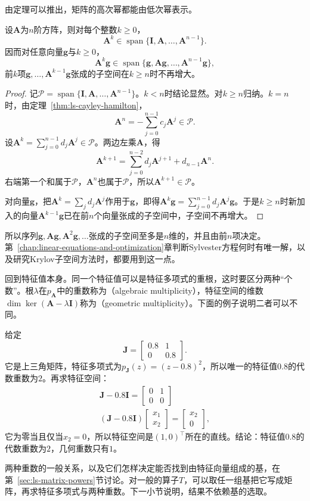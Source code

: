 由定理可以推出，矩阵的高次幂都能由低次幂表示。
\begin{theorem}[高次幂的降次]
\label{thm:ls-power-reduction}
设$\bm A$为$n$阶方阵，则对每个整数$k\geq0$，
\[
 \bm A^k\in\operatorname{span}\{\bm I,\bm A,\ldots,\bm A^{n-1}\}.
\]
因而对任意向量$\bm g$与$k\geq0$，
\[
 \bm A^k\bm g\in\operatorname{span}\{\bm g,\bm A\bm g,\ldots,\bm A^{n-1}\bm g\},
\]
前$k$项$\bm g,\ldots,\bm A^{k-1}\bm g$张成的子空间在$k\geq n$时不再增大。
\end{theorem}
\begin{proof}
记$\mathcal P=\operatorname{span}\{\bm I,\bm A,\ldots,\bm A^{n-1}\}$。$k<n$时结论显然。对$k\geq n$归纳。$k=n$时，由定理~\ref{thm:ls-cayley-hamilton}，
\[
 \bm A^n=-\sum_{j=0}^{n-1}c_j\bm A^j\in\mathcal P .
\]
设$\bm A^k=\sum_{j=0}^{n-1}d_j\bm A^j\in\mathcal P$。两边左乘$\bm A$，得
\[
 \bm A^{k+1}=\sum_{j=0}^{n-2}d_j\bm A^{j+1}+d_{n-1}\bm A^n .
\]
右端第一个和属于$\mathcal P$，$\bm A^n$也属于$\mathcal P$，所以$\bm A^{k+1}\in\mathcal P$。

对向量$\bm g$，把$\bm A^k=\sum_jd_j\bm A^j$作用于$\bm g$，即得$\bm A^k\bm g=\sum_{j=0}^{n-1}d_j\bm A^j\bm g$。于是$k\geq n$时新加入的向量$\bm A^{k-1}\bm g$已在前$n$个向量张成的子空间中，子空间不再增大。
\end{proof}
所以序列$\bm g,\bm A\bm g,\bm A^2\bm g,\ldots$张成的子空间至多是$n$维的，并且由前$n$项决定。第~\ref{chap:linear-equations-and-optimization}章判断Sylvester方程何时有唯一解，以及研究Krylov子空间方法时，都要用到这一点。

回到特征值本身。同一个特征值可以是特征多项式的重根，这时要区分两种“个数”。根$\lambda$在$p_{\bm A}$中的重数称为（algebraic multiplicity），特征空间的维数$\dim\ker(\bm A-\lambda\bm I)$称为（geometric multiplicity）。下面的例子说明二者可以不同。
\begin{example}[代数重数大于几何重数]
\label{ex:ls-multiplicity-gap}
给定
\[
 \bm J=\begin{bmatrix}0.8&1\\0&0.8\end{bmatrix}.
\]
它是上三角矩阵，特征多项式为$p_{\bm J}(z)=(z-0.8)^2$，所以唯一的特征值$0.8$的代数重数为$2$。再求特征空间：
\[
\begin{gathered}
\bm J-0.8\bm I=\begin{bmatrix}0&1\\0&0\end{bmatrix}\\
(\bm J-0.8\bm I)\begin{bmatrix}x_1\\x_2\end{bmatrix}=\begin{bmatrix}x_2\\0\end{bmatrix},
\end{gathered}
\]
它为零当且仅当$x_2=0$，所以特征空间是$(1,0)^{\top}$所在的直线。结论：特征值$0.8$的代数重数为$2$，几何重数只有$1$。
\end{example}
两种重数的一般关系，以及它们怎样决定能否找到由特征向量组成的基，在第~\ref{sec:ls-matrix-powers}节讨论。对一般的算子$T$，可以取任一组基把它写成矩阵，再求特征多项式与两种重数。下一小节说明，结果不依赖基的选取。

